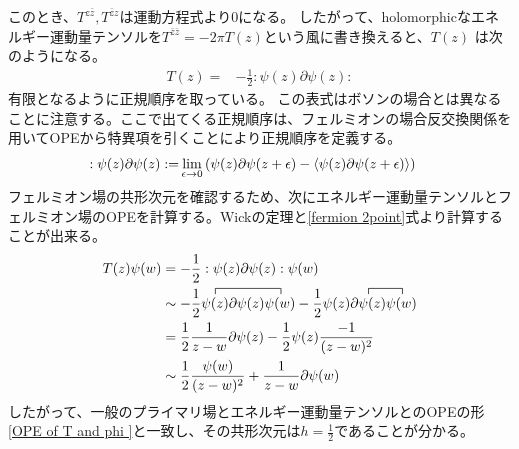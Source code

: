 \documentclass[11pt, dvipdfmx]{article}
\numberwithin{equation}{section}
\newcommand{\blankline}{\par\vspace{\baselineskip}} %
\begin{document}
このとき、$T^{z\bar{z}},T^{\bar{z}z}$は運動方程式より0になる。
したがって、holomorphicなエネルギー運動量テンソルを$T^{\bar{z}\bar{z}}=-2\pi T(z)$という風に書き換えると、$T(z)$
は次のようになる。
\begin{align}
    T(z)=& -\frac{1}{2}:\psi(z)\partial \psi(z):
\end{align}
有限となるように正規順序を取っている。
この表式はボソンの場合とは異なることに注意する。ここで出てくる正規順序は、フェルミオンの場合反交換関係を用いてOPEから特異項を引くことにより正規順序を定義する。
\begin{align}
    :\psi(z)\partial \psi(z):=& \lim_{\epsilon \to 0}\qty(\psi(z)\partial \psi(z+\epsilon) - \ev{\psi(z)\partial \psi(z+\epsilon)})
\end{align}
フェルミオン場の共形次元を確認するため、次にエネルギー運動量テンソルとフェルミオン場のOPEを計算する。Wickの定理と\eqref{fermion 2point}式より計算することが出来る。
\begin{align}
    T(z)\psi(w)&=-\frac{1}{2}:\psi(z)\partial \psi(z):\psi(w)\notag\\
    &\sim -\frac{1}{2}\contraction{}{\psi(z)}{\partial\psi(z)}{\psi(w)}\psi(z)\partial \psi(z)\psi(w) -\frac{1}{2}\contraction {\psi(z)}{\partial \psi (z)}{}{\psi(w)} \psi(z)\partial \psi(z)\psi(w)\notag\\
    &= \frac{1}{2}\frac{1}{z-w}\partial \psi(z)-\frac{1}{2}\psi(z)\frac{-1}{(z-w)^2}\notag\\
    &\sim \frac{1}{2}\frac{\psi(w)}{(z-w)^2} + \frac{1}{z-w}\partial \psi(w)
\end{align}
したがって、一般のプライマリ場とエネルギー運動量テンソルとのOPEの形\eqref{OPE of T and phi }と一致し、その共形次元は$h=\frac{1}{2}$であることが分かる。
\blankline
\end{document}
